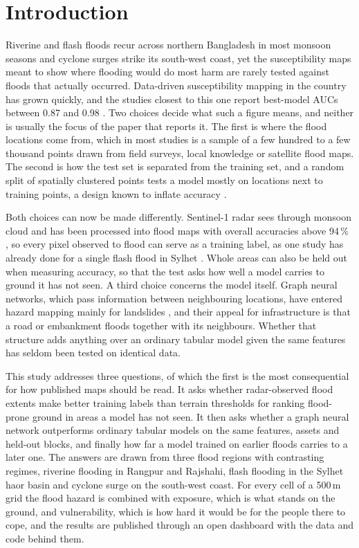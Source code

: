 \thispagestyle{plain}

\section{Introduction}
\label{sec:intro}

Riverine and flash floods recur across northern Bangladesh in most monsoon seasons and cyclone surges strike its south-west coast, yet the susceptibility maps meant to show where flooding would do most harm are rarely tested against floods that actually occurred. Data-driven susceptibility mapping in the country has grown quickly, and the studies closest to this one report best-model AUCs between 0.87 and 0.98 \citep{islam2021, talukdar2020, islamr2024, adnan2023}. Two choices decide what such a figure means, and neither is usually the focus of the paper that reports it. The first is where the flood locations come from, which in most studies is a sample of a few hundred to a few thousand points drawn from field surveys, local knowledge or satellite flood maps. The second is how the test set is separated from the training set, and a random split of spatially clustered points tests a model mostly on locations next to training points, a design known to inflate accuracy \citep{roberts2017, ploton2020}.

Both choices can now be made differently. Sentinel-1 radar sees through monsoon cloud and has been processed into flood maps with overall accuracies above 94\,\% \citep{twele2016, uddin2019}, so every pixel observed to flood can serve as a training label, as one study has already done for a single flash flood in Sylhet \citep{islamr2024}. Whole areas can also be held out when measuring accuracy, so that the test asks how well a model carries to ground it has not seen. A third choice concerns the model itself. Graph neural networks, which pass information between neighbouring locations, have entered hazard mapping mainly for landslides \citep{wang2023, ma2025}, and their appeal for infrastructure is that a road or embankment floods together with its neighbours. Whether that structure adds anything over an ordinary tabular model given the same features has seldom been tested on identical data.

This study addresses three questions, of which the first is the most consequential for how published maps should be read. It asks whether radar-observed flood extents make better training labels than terrain thresholds for ranking flood-prone ground in areas a model has not seen. It then asks whether a graph neural network outperforms ordinary tabular models on the same features, assets and held-out blocks, and finally how far a model trained on earlier floods carries to a later one. The answers are drawn from three flood regions with contrasting regimes, riverine flooding in Rangpur and Rajshahi, flash flooding in the Sylhet haor basin and cyclone surge on the south-west coast. For every cell of a 500\,m grid the flood hazard is combined with exposure, which is what stands on the ground, and vulnerability, which is how hard it would be for the people there to cope, and the results are published through an open dashboard with the data and code behind them.

